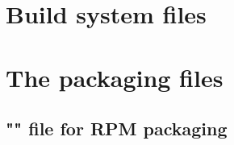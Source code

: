
\chapter{Build system files}

\clearpage


\newpage


\chapter{The packaging files}

\clearpage

\section{"" file for RPM packaging}
\label{spec}
\vspace{-1cm}
